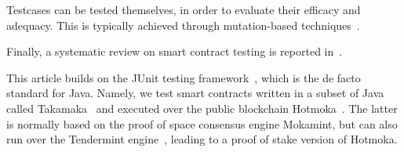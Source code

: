 Testcases can be tested themselves, in order to evaluate their
efficacy and adequacy. This is typically achieved through
mutation-based techniques~\citep{ChenZZZW24,BanescuB0PZ24,Barboni0PBZ24}.

Finally, a systematic review on smart contract testing is reported
in~\citep{ImperiusA22}.

This article builds on the JUnit testing framework~\citep{junit},
which is the de facto standard for Java. Namely, we test smart contracts
written in a subset of Java called Takamaka~\citep{Spoto19} and
executed over the public blockchain Hotmoka~\citep{hotmoka}. The latter
is normally based on the proof of space consensus engine Mokamint,
but can also run over the Tendermint engine~\citep{Kwon14},
leading to a proof of stake version of Hotmoka.
